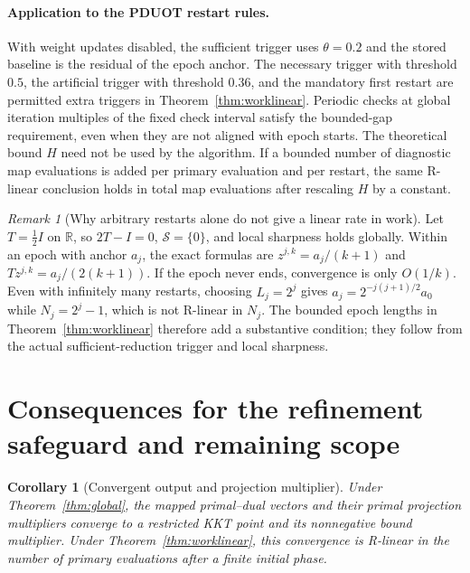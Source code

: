 \documentclass[11pt]{article}
\newtheorem{corollary}[theorem]{Corollary}
\theoremstyle{remark}
\newtheorem{remark}[theorem]{Remark}
\newcommand{\R}{\mathbb R}
\begin{document}
\paragraph{Application to the PDUOT restart rules.}
With weight updates disabled, the sufficient trigger uses $\theta=0.2$ and the stored baseline is the residual of the epoch anchor.
The necessary trigger with threshold $0.5$, the artificial trigger with threshold $0.36$, and the mandatory first restart are permitted extra triggers in Theorem~\ref{thm:worklinear}.
Periodic checks at global iteration multiples of the fixed check interval satisfy the bounded-gap requirement, even when they are not aligned with epoch starts.
The theoretical bound $H$ need not be used by the algorithm.
If a bounded number of diagnostic map evaluations is added per primary evaluation and per restart, the same R-linear conclusion holds in total map evaluations after rescaling $H$ by a constant.

\begin{remark}[Why arbitrary restarts alone do not give a linear rate in work]
Let $T=\tfrac12 I$ on $\R$, so $2T-I=0$, $\mathcal S=\{0\}$, and local sharpness holds globally.
Within an epoch with anchor $a_j$, the exact formulas are $z^{j,k}=a_j/(k+1)$ and $Tz^{j,k}=a_j/(2(k+1))$.
If the epoch never ends, convergence is only $O(1/k)$.
Even with infinitely many restarts, choosing $L_j=2^j$ gives $a_j=2^{-j(j+1)/2}a_0$ while $N_j=2^j-1$, which is not R-linear in $N_j$.
The bounded epoch lengths in Theorem~\ref{thm:worklinear} therefore add a substantive condition; they follow from the actual sufficient-reduction trigger and local sharpness.
\end{remark}

\section{Consequences for the refinement safeguard and remaining scope}

\begin{corollary}[Convergent output and projection multiplier]
\label{cor:multiplier}
Under Theorem~\ref{thm:global}, the mapped primal--dual vectors and their primal projection multipliers converge to a restricted KKT point and its nonnegative bound multiplier.
Under Theorem~\ref{thm:worklinear}, this convergence is R-linear in the number of primary evaluations after a finite initial phase.
\end{corollary}
\end{document}
